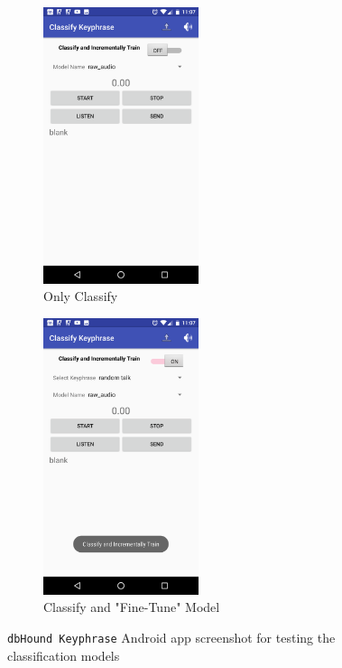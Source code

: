 \begin{figure}[!th]
\centering
\begin{subfigure}{0.5\textwidth}
\centering
\includegraphics[width=0.5\textwidth]{sound/app_classify.png}
\caption{Only Classify}
\end{subfigure}%
\begin{subfigure}{0.5\textwidth}
\centering
\includegraphics[width=0.5\textwidth]{sound/app_classify_and_train.png}
\caption{Classify and "Fine-Tune" Model}
\end{subfigure}%
\caption{\texttt{dbHound Keyphrase} Android app screenshot for testing the classification models}
\label{fig:dbhound_test}
\end{figure}

